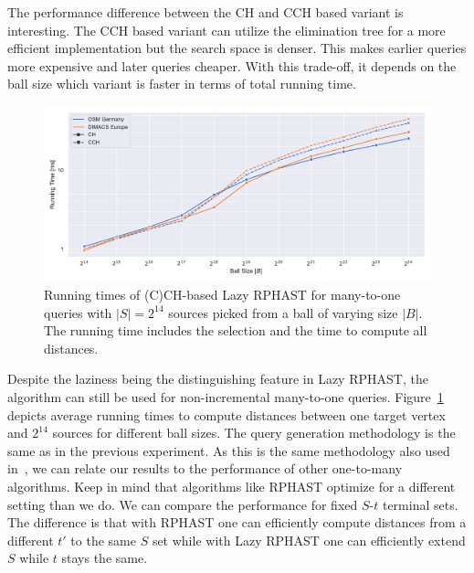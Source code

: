 \documentclass[manuscript,review]{acmart}
\begin{document}
The performance difference between the CH and CCH based variant is interesting.
The CCH based variant can utilize the elimination tree for a more efficient implementation but the search space is denser.
This makes earlier queries more expensive and later queries cheaper.
With this trade-off, it depends on the ball size which variant is faster in terms of total running time.

\begin{figure}
\centering
\includegraphics[width=\linewidth]{fig/lazy_rphast_many_to_one_both.pdf}
\caption{
Running times of (C)CH-based Lazy RPHAST for many-to-one queries with $|S| = 2^{14}$ sources picked from a ball of varying size $|B|$.
The running time includes the selection and the time to compute all distances.
}\label{fig:many_to_one}
\end{figure}

Despite the laziness being the distinguishing feature in Lazy RPHAST, the algorithm can still be used for non-incremental many-to-one queries.
Figure~\ref{fig:many_to_one} depicts average running times to compute distances between one target vertex and $2^{14}$ sources for different ball sizes.
The query generation methodology is the same as in the previous experiment.
As this is the same methodology also used in~\cite{delling_et_al:OASIcs:2011:3266}, we can relate our results to the performance of other one-to-many algorithms.
Keep in mind that algorithms like RPHAST optimize for a different setting than we do.
We can compare the performance for fixed $S$-$t$ terminal sets.
The difference is that with RPHAST one can efficiently compute distances from a different $t'$ to the same $S$ set while with Lazy RPHAST one can efficiently extend $S$ while $t$ stays the same.
\end{document}
